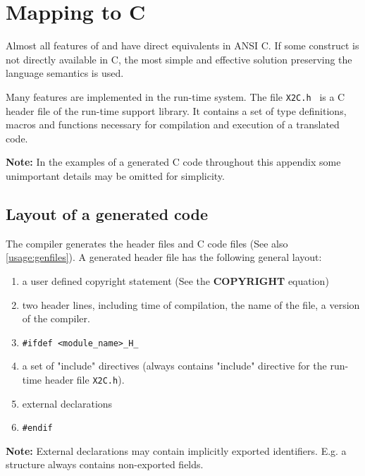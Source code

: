 \chapter{Mapping to C}\label{maptoc}

Almost all features of \mt{} and \ot{} have direct equivalents in
ANSI C. If some construct is not directly available in C, the
most simple and effective solution preserving the language
semantics is used.

Many features are implemented in the run-time system. The file
{\tt X2C.h } is a C header file of the run-time
support library. It contains a set of type definitions, macros
and  functions  necessary for compilation and execution of
a translated code.

{\bf Note:} In the examples of a generated C code throughout this
appendix some unimportant details may be omitted for simplicity.

\section{Layout of a generated code}\label{maptoc:layout}

The compiler generates the header files and C code files (See also
\ref{usage:genfiles}). A generated header file has the
following general layout:
\begin{enumerate}
\item   a user defined copyright statement (See the {\bf COPYRIGHT}
        equation)

\item   two header lines, including time of compilation,
        the name of the file, a version of the \xds{} compiler.

\item   \verb+#ifdef <module_name>_H_+

\item   a set of "include" directives (always contains "include" directive
        for the run-time header file {\tt X2C.h}).

\item   external declarations

\item   \verb+#endif+

\end{enumerate}

{\bf  Note:}  External declarations may contain implicitly
exported identifiers. E.g. a structure always contains
non-exported fields.

